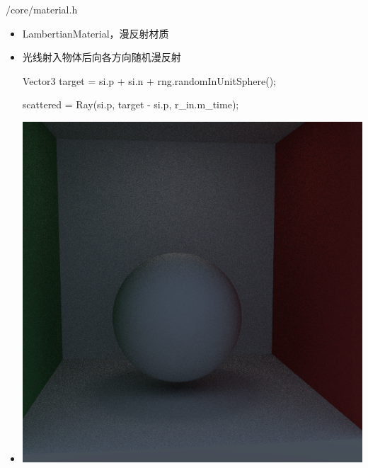 \documentclass{beamer}
\begin{document}
\begin{frame} {/core/material.h}
\begin{itemize}
\item LambertianMaterial，漫反射材质
\item 光线射入物体后向各方向随机漫反射
\begin{semiverbatim} \small Vector3 target = si.p + si.n + rng.randomInUnitSphere(); \end{semiverbatim}
\begin{semiverbatim} \small scattered = Ray(si.p, target - si.p, r\_in.m\_time); \end{semiverbatim}
\item \includegraphics[scale=0.2]{lamb}
\end{itemize}
\end{frame}
\end{document}
